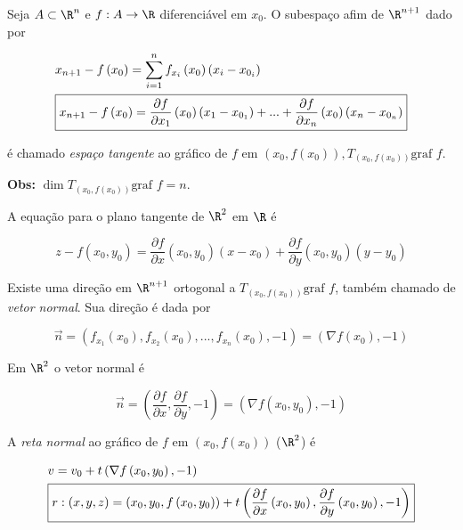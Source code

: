 \documentclass{book}
\begin{document}
\begin{defn}
    Seja $A \subset \R^n$ e $f:A \to \R$ diferenci\'avel em $x_0$. O subespa\c co afim de $\R^{n + 1}$ dado por

\[
\begin{gathered}
  x_{n + 1}  - f\left( {x_0 } \right) = \sum\limits_{i = 1}^n {f_{x_i } \left( {x_0 } \right)\left( {x_i  - x_{0_i } } \right)}  \hfill \\
\boxed{x_{n + 1}  - f\left( {x_0 } \right) = \frac{{\partial f}}
{{\partial x_1 }}\left( {x_0 } \right)\left( {x_1  - x_{0_1 } } \right) + ... + \frac{{\partial f}}
{{\partial x_n }}\left( {x_0 } \right)\left( {x_n  - x_{0_n } } \right) \hfill }\\
\end{gathered}
\]

    \'e chamado \textit{espa\c co tangente} ao gr\'afico de $f$ em $\left( {x_0 ,f\left( {x_0 } \right)} \right),T_{\left( {x_0 ,f\left( {x_0 } \right)} \right)} {\text{graf }}f$.

    \textbf{Obs:} $\dim T_{\left( {x_0 ,f\left( {x_0 } \right)} \right)} {\text{graf }}f = n$.

A equa\c c\~ao para o plano tangente de $\R^2$ em $\R$ \'e

\[\boxed{
z - f\left( {x_0 ,y_0 } \right) = \frac{{\partial f}}
    {{\partial x}}\left( {x_0 ,y_0 } \right)\left( {x - x_0 } \right) + \frac{{\partial f}}
{{\partial y}}\left( {x_0 ,y_0 } \right)\left( {y - y_0 } \right)}
\]

    Existe uma dire\c c\~ao em $\R^{n + 1}$ ortogonal a $T_{\left( {x_0 ,f\left( {x_0 } \right)} \right)} {\text{graf }}f$, tamb\'em chamado de \textit{vetor normal}. Sua dire\c c\~ao \'e dada por

\[
    \overrightarrow n  = \left( {f_{x_1 } \left( {x_0 } \right),f_{x_2 } \left( {x_0 } \right),...,f_{x_n } \left( {x_0 } \right), - 1} \right) = \left( {\nabla f\left( {x_0 } \right), - 1} \right)
\]

Em $\R^2$ o vetor normal \'e

\[
\overrightarrow n  = \left( {\frac{{\partial f}}
{{\partial x}},\frac{{\partial f}}
    {{\partial y}}, - 1} \right) = \left( {\nabla f\left( {x_0 ,y_0 } \right), - 1} \right)
\]

    A \textit{reta normal} ao gr\'afico de $f$ em $\left( {x_0 ,f\left( {x_0 } \right)} \right)$ ($\R^2$) \'e

\[
\begin{gathered}
      v = v_0  + t\left( {\nabla f\left( {x_0 ,y_0 } \right), - 1} \right) \hfill \\
      \boxed{r: \left( {x,y,z} \right) = \left( {x_0 ,y_0 ,f\left( {x_0 ,y_0 } \right)} \right) + t\left( {\frac{{\partial f}}
{{\partial x}}\left( {x_0 ,y_0 } \right),\frac{{\partial f}}
{{\partial y}}\left( {x_0 ,y_0 } \right), - 1} \right) \hfill} \\
\end{gathered}
\]

\end{defn}
\end{document}
